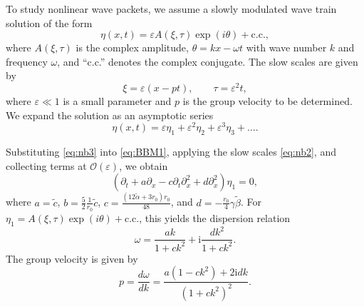 \documentclass[alpha-refs, 12pt]{wiley-article}
\renewcommand{\O}{\mathcal{O}}
\newcommand{\ui}{\mathrm{i}}
\newcommand{\eps}{\varepsilon}
\begin{document}
To study nonlinear wave packets, we assume a slowly modulated wave train solution of the form
\begin{equation}\label{eq:nb1}
  \eta(x,t) = \eps A(\xi, \tau) \exp(i \theta) + \text{c.c.},
\end{equation}
where $A(\xi, \tau)$ is the complex amplitude, $\theta = k x - \omega t$ with wave number $k$ and frequency $\omega$, and ``c.c.'' denotes the complex conjugate. The slow scales are given by
\begin{equation}\label{eq:nb2}
  \xi = \eps (x - p t), \qquad \tau = \eps^2 t,
\end{equation}
where $\eps \ll 1$ is a small parameter and $p$ is the group velocity to be determined. We expand the solution as an asymptotic series
\begin{equation}\label{eq:nb3}
  \eta(x,t) = \eps \eta_1 + \eps^2 \eta_2 + \eps^3 \eta_3 + \dots.
\end{equation}

Substituting \eqref{eq:nb3} into \eqref{eq:BBM1}, applying the slow scales \eqref{eq:nb2}, and collecting terms at $\O(\eps)$, we obtain
\begin{equation}\label{eq:first_order}
  \left(\partial_t + a \partial_x - c \partial_t \partial_x^2 + d \partial_x^2 \right)\eta_1 = 0,
\end{equation}
where $a = \tilde{c}$, $b = \frac{5}{2} \frac{1}{r_0} \tilde{c}$, $c = \frac{(12 \tilde{\alpha} + 3 r_0) r_0}{48}$, and $d = -\frac{r_0}{4} \gamma \tilde{\beta}$. For $\eta_1 = A(\xi, \tau) \exp(i \theta) + \text{c.c.}$, this yields the dispersion relation
\begin{equation}\label{eq:dispersion_bbm_a}
  \omega = \frac{a k}{1 + c k^2} + \ui \frac{d k^2}{1 + c k^2}.
\end{equation}
The group velocity is given by
\[
  p = \frac{d \omega}{d k} = \frac{a (1 - c k^2) + 2 \ui d k}{(1 + c k^2)^2}.
\]
\end{document}
